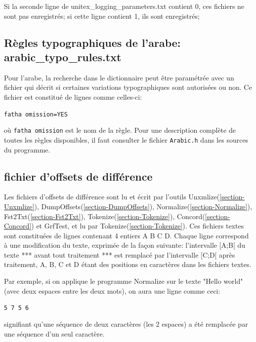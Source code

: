 Si la seconde ligne de unitex\_logging\_parameters.txt contient 0, ces fichiers ne sont pas
enregistrés; si cette ligne contient 1, ils sont enregistrés;

\subsection{Règles typographiques de l'arabe: arabic\_typo\_rules.txt}
\label{subsection-arabic-typo-rules}
Pour l'arabe, la recherche dans le dictionnaire peut être paramétrée avec un fichier qui décrit si
certaines variations typographiques sont autorisées ou non. Ce fichier est constitué de lignes comme
celles-ci:

\bigskip
\noindent \verb+fatha omission=YES+

\bigskip
\noindent où \verb+fatha omission+ est le nom de la règle. Pour une description complète de toutes
les règles disponibles, il faut consulter le fichier \verb+Arabic.h+ dans les sources du programme.

\subsection{fichier d'offsets de différence}
\label{subsection-offsets-diff}

Les fichiers d'offsets de différence sont lu et écrit par l'outils Unxmlize(\ref{section-Unxmlize}), DumpOffsets(\ref{section-DumpOffsets}), Normalize(\ref{section-Normalize}), Fst2Txt(\ref{section-Fst2Txt}), Tokenize(\ref{section-Tokenize}), Concord(\ref{section-Concord}) et GrfTest, et lu par Tokenize(\ref{section-Tokenize}).
\bigskip
Ces fichiers textes sont constituées de lignes contenant 4 entiers A B C D. Chaque ligne correspond à une modification du texte, exprimée de la façon suivante:
\bigskip
l'intervalle [A;B[ du texte *** avant tout traitement *** est remplacé par l'intervalle [C;D[ après traitement, A, B, C et D étant des positions en caractères dans les fichiers textes.
\bigskip

Par exemple, si on applique le programme Normalize sur le texte "Hello  world" (avec deux espaces entre les deux mots), on aura une ligne comme ceci:

\bigskip
\noindent \verb+5 7 5 6+
\bigskip

signifiant qu'une séquence de deux caractères (les 2 espaces) a été remplacée par une séquence d'un seul caractère.

